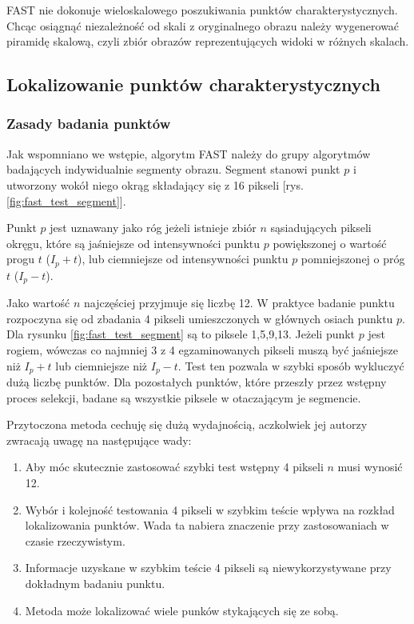 FAST nie dokonuje wieloskalowego poszukiwania punktów charakterystycznych. Chcąc osiągnąć niezależność od skali z oryginalnego obrazu należy wygenerować piramidę skalową, czyli zbiór obrazów reprezentujących widoki w różnych skalach.
\subsection{Lokalizowanie punktów charakterystycznych}
\subsubsection{Zasady badania punktów}
Jak wspomniano we wstępie, algorytm FAST należy do grupy algorytmów badających indywidualnie segmenty obrazu. Segment stanowi punkt $p$ i utworzony wokół niego okrąg składający się z 16 pikseli [rys. \ref{fig:fast_test_segment}]. 

Punkt $p$ jest uznawany jako róg jeżeli istnieje zbiór $n$ sąsiadujących pikseli okręgu, które są jaśniejsze od  intensywności punktu $p$ powiększonej o wartość progu $t$ ($I_p + t$), lub ciemniejsze od intensywności punktu $p$ pomniejszonej o próg $t$ ($I_p - t$). 

Jako wartość $n$ najczęściej przyjmuje się liczbę 12. W praktyce badanie punktu rozpoczyna się od zbadania 4 pikseli umieszczonych w głównych osiach punktu $p$. Dla rysunku \ref{fig:fast_test_segment} są to piksele 1,5,9,13. Jeżeli punkt $p$ jest rogiem, wówczas co najmniej 3 z 4 egzaminowanych pikseli muszą być jaśniejsze niż $I_p + t$ lub ciemniejsze niż $I_p - t$. Test ten pozwala w szybki sposób wykluczyć dużą liczbę punktów. Dla pozostałych punktów, które przeszły przez wstępny proces selekcji, badane są wszystkie piksele w otaczającym je segmencie.

Przytoczona metoda cechuję się dużą wydajnością, aczkolwiek jej autorzy zwracają uwagę na następujące wady:
\begin{enumerate}
\item Aby móc skutecznie zastosować szybki test wstępny 4 pikseli $n$ musi wynosić 12.
\item Wybór i kolejność testowania 4 pikseli w szybkim teście wpływa na rozkład lokalizowania punktów. Wada ta nabiera znaczenie przy zastosowaniach w czasie rzeczywistym.
\item Informacje uzyskane w szybkim teście 4 pikseli są niewykorzystywane przy dokładnym badaniu punktu.
\item Metoda może lokalizować wiele punków stykających się ze sobą.
\end{enumerate}



